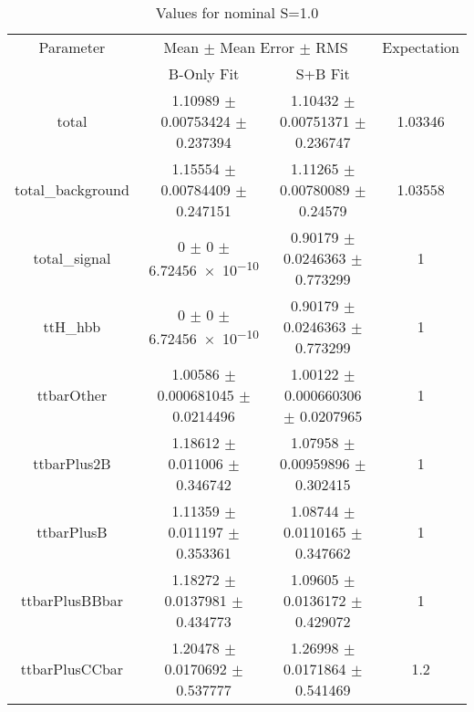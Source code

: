 \begin{table}
\centering
\caption{Values for nominal S=1.0}
\begin{tabular}{cccc}
\toprule
Parameter & \multicolumn{2}{c}{Mean $\pm$ Mean Error $\pm$ RMS} & Expectation\\
 & B-Only Fit & S+B Fit & \\
\midrule
total & \num{1.10989} $\pm$ \num{0.00753424} $\pm$ \num{0.237394} & \num{1.10432} $\pm$ \num{0.00751371} $\pm$ \num{0.236747} & \num{1.03346}\\
total\_background & \num{1.15554} $\pm$ \num{0.00784409} $\pm$ \num{0.247151} & \num{1.11265} $\pm$ \num{0.00780089} $\pm$ \num{0.24579} & \num{1.03558}\\
total\_signal & \num{0} $\pm$ \num{0} $\pm$ \num{6.72456e-10} & \num{0.90179} $\pm$ \num{0.0246363} $\pm$ \num{0.773299} & \num{1}\\
ttH\_hbb & \num{0} $\pm$ \num{0} $\pm$ \num{6.72456e-10} & \num{0.90179} $\pm$ \num{0.0246363} $\pm$ \num{0.773299} & \num{1}\\
ttbarOther & \num{1.00586} $\pm$ \num{0.000681045} $\pm$ \num{0.0214496} & \num{1.00122} $\pm$ \num{0.000660306} $\pm$ \num{0.0207965} & \num{1}\\
ttbarPlus2B & \num{1.18612} $\pm$ \num{0.011006} $\pm$ \num{0.346742} & \num{1.07958} $\pm$ \num{0.00959896} $\pm$ \num{0.302415} & \num{1}\\
ttbarPlusB & \num{1.11359} $\pm$ \num{0.011197} $\pm$ \num{0.353361} & \num{1.08744} $\pm$ \num{0.0110165} $\pm$ \num{0.347662} & \num{1}\\
ttbarPlusBBbar & \num{1.18272} $\pm$ \num{0.0137981} $\pm$ \num{0.434773} & \num{1.09605} $\pm$ \num{0.0136172} $\pm$ \num{0.429072} & \num{1}\\
ttbarPlusCCbar & \num{1.20478} $\pm$ \num{0.0170692} $\pm$ \num{0.537777} & \num{1.26998} $\pm$ \num{0.0171864} $\pm$ \num{0.541469} & \num{1.2}\\
\bottomrule
\end{tabular}
\end{table}